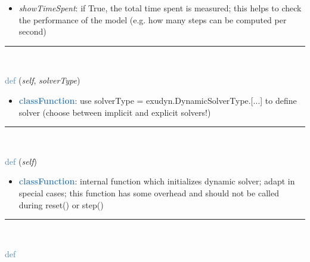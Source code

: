 \begin{itemize}[leftmargin=1.4cm]
\begin{itemize}[leftmargin=1.4cm]
\begin{itemize}[leftmargin=0.7cm]
\begin{itemize}[leftmargin=1.2cm]
\item[]{\it showTimeSpent}: if True, the total time spent is measured; this helps to check the performance of the model (e.g. how many steps can be computed per second)
\end{itemize}
\vspace{12pt}\end{itemize}
%
\noindent\rule{8cm}{0.75pt}\vspace{1pt} \\ 
\begin{flushleft}
\noindent \textcolor{steelblue}{def {\bf {}}}\label{sec:artificialIntelligence:OpenAIGymInterfaceEnv(Env):SetSolver}
({\it self}, {\it solverType})
\end{flushleft}
\setlength{\itemindent}{0.7cm}
\begin{itemize}[leftmargin=0.7cm]
\item[--]\textcolor{steelblue}{\bf classFunction}: use solverType = exudyn.DynamicSolverType.[...] to define solver (choose between implicit and explicit solvers!)
\vspace{12pt}\end{itemize}
%
\noindent\rule{8cm}{0.75pt}\vspace{1pt} \\ 
\begin{flushleft}
\noindent \textcolor{steelblue}{def {\bf {}}}\label{sec:artificialIntelligence:OpenAIGymInterfaceEnv(Env):PreInitializeSolver}
({\it self})
\end{flushleft}
\setlength{\itemindent}{0.7cm}
\begin{itemize}[leftmargin=0.7cm]
\item[--]\textcolor{steelblue}{\bf classFunction}: internal function which initializes dynamic solver; adapt in special cases; this function has some overhead and should not be called during reset() or step()
\vspace{12pt}\end{itemize}
%
\noindent\rule{8cm}{0.75pt}\vspace{1pt} \\ 
\begin{flushleft}
\noindent \textcolor{steelblue}{def {\bf {}}}\label{sec:artificialIntelligence:OpenAIGymInterfaceEnv(Env):IntegrateStep}

\end{flushleft}
\end{itemize}
\end{itemize}
